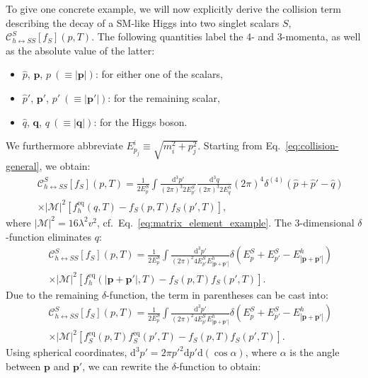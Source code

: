 To give one concrete example, we will now explicitly derive the collision term describing the decay of a SM-like Higgs into two singlet scalars $S$, $\mathcal{C}^S_{h \leftrightarrow SS}[f_S](p,T)$. The following quantities label the 4- and 3-momenta, as well as the absolute value of the latter:
\begin{itemize}
\item $\hat p$, $\mathbf{p}$, $p\ (\equiv |\mathbf{p}|)$: for either one of the scalars,
\item $\hat p'$, $\mathbf{p'}$, $p'\ (\equiv |\mathbf{p'}|)$: for the remaining scalar,
\item $\hat q$, $\mathbf{q}$, $q\ (\equiv |\mathbf{q}|)$: for the Higgs boson.
\end{itemize}
We furthermore abbreviate $E^i_{p_j}\equiv \sqrt{m_i^2+p_j^2}$. Starting from Eq.~\eqref{eq:collision-general}, we obtain:
\begin{eqnarray}
&& \mathcal{C}^S_{h\leftrightarrow SS}[f_S](p,T) = \frac{1}{2 E^S_p} \int \frac{\mathrm{d}^3p'}{(2 \pi)^3 2 E^S_{p'}} \frac{\mathrm{d}^3 q}{(2 \pi)^3 2 E^h_{q}} ( 2 \pi )^4 \delta^{(4)} \left( \hat p+ \hat p'- \hat q\right) \; \nonumber\\
&&\times |\mathcal{M}|^2 \left[ f^\text{eq}_h(q,T) - f_S(p,T) f_S(p',T)  \right],
\end{eqnarray}
where $|\mathcal{M}|^2 = 16\lambda^2v^2$, cf.\ Eq.~\eqref{eq:matrix_element_example}. The 3-dimensional $\delta$-function eliminates $q$:
\begin{eqnarray}
&&\mathcal{C}^S_{h\leftrightarrow SS} [f_S](p,T)= \frac{1}{2 E^S_p} \int \frac{\mathrm{d}^3 p'}{(2 \pi)^2 4 E^S_{p'} E^h_{|\mathbf{p}+\mathbf{p'}|}} \delta (E^S_p+E^S_{p'} - E^h_{|\mathbf{p}+\mathbf{p'}|}) \;\nonumber\\
&&\times |\mathcal{M}|^2 \left[ f^\text{eq}_h(|\mathbf{p}+\mathbf{p'}|,T) - f_S(p,T) f_S(p',T)  \right].
\end{eqnarray}
Due to the remaining $\delta$-function, the term in parentheses can be cast into:
\begin{eqnarray}
&&\mathcal{C}^S_{h\leftrightarrow SS} [f_S](p,T) = \frac{1}{2 E^S_p} \int \frac{\mathrm{d}^3p'}{(2 \pi)^2 4 E^S_{p'} E^h_{|\mathbf{p}+\mathbf{p'}|}} \delta (E^S_p+E^S_{p'} - E^h_{|\mathbf{p}+\mathbf{p'}|}) \;\nonumber\\
&&\times |\mathcal{M}|^2 \left[ f^\text{eq}_S(p,T)f^\text{eq}_S(p',T) - f_S(p,T) f_S(p',T)  \right].
\end{eqnarray}
Using spherical coordinates, $\mathrm{d}^3p'=2\pi p'^2\mathrm{d}p'\mathrm{d}(\cos\alpha)$, where $\alpha$ is the angle between $\mathbf{p}$ and $\mathbf{p'}$, we can rewrite the $\delta$-function to obtain:
